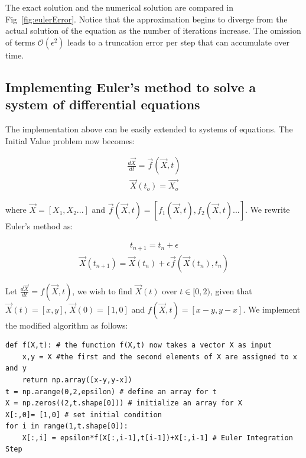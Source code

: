 \documentclass[10pt,letterpaper]{article}
\begin{document}
\begin{nolinenumbers}
The exact solution and the numerical solution are compared in Fig~\ref{fig:eulerError}. Notice that the approximation begins to diverge from the actual solution of the equation as the number of iterations increase. The omission of terms $\mathcal{O}(\epsilon^2)$ leads to a truncation error per step that can accumulate over time. 

\subsection*{Implementing Euler's method to solve a system of differential equations}

The implementation above can be easily extended to systems of equations. The Initial Value problem now becomes:

\begin{eqnarray}\frac{d\vec{X}}{dt} = \vec{f}(\vec{X}, t)\end{eqnarray}
\begin{eqnarray}\vec{X}(t_o) = \vec{X_o}\end{eqnarray}

where $\vec{X}=[X_1,X_2...]$ and $\vec{f}(\vec{X}, t)=[f_1(\vec{X}, t),f_2(\vec{X}, t)...]$. We rewrite Euler's method as:

\begin{eqnarray}t_{n+1} = t_n + \epsilon \end{eqnarray}
\begin{eqnarray}\vec{X}(t_{n+1}) = \vec{X}(t_{n}) + \epsilon \vec{f}(\vec{X}(t_{n}), t_n)\end{eqnarray}

Let $\frac{d\vec{X}}{dt}=f(\vec{X},t)$, we wish to find $\vec{X}(t)$ over $t\in[0,2)$, given that $\vec{X}(t)=[x,y]$, $\vec{X}(0)=[1,0]$ and $f(\vec{X},t) = [x-y,y-x]$. We implement the modified algorithm as follows:

\begin{verbatim}
def f(X,t): # the function f(X,t) now takes a vector X as input
    x,y = X #the first and the second elements of X are assigned to x and y
    return np.array([x-y,y-x])
t = np.arange(0,2,epsilon) # define an array for t
X = np.zeros((2,t.shape[0])) # initialize an array for X
X[:,0]= [1,0] # set initial condition
for i in range(1,t.shape[0]):
    X[:,i] = epsilon*f(X[:,i-1],t[i-1])+X[:,i-1] # Euler Integration Step
\end{verbatim}


\end{nolinenumbers}
\end{document}
